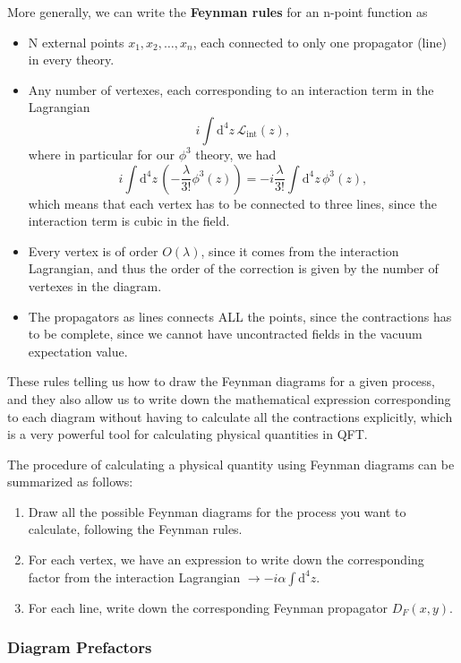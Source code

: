 More generally, we can write the \textbf{Feynman rules} for an n-point function as
\begin{itemize}
    \item N external points \(x_1, x_2, \ldots, x_n\), each connected to only one propagator (line) in every theory.
    \item Any number of vertexes, each corresponding to an interaction term in the Lagrangian
          \[
              i \int \mathrm{d}^4 z \, \mathcal{L}_{\text{int}} (z),
          \]
          where in particular for our \(\phi^3\) theory, we had
          \[
              i \int \mathrm{d}^4 z \, (-\frac{\lambda}{3!} \phi^3 (z)) = -i \frac{\lambda}{3!} \int \mathrm{d}^4 z \, \phi^3 (z),
          \]
          which means that each vertex has to be connected to three lines, since the interaction term is cubic in the field.
    \item Every vertex is of order \(O(\lambda)\), since it comes from the interaction Lagrangian, and thus the order of the correction is given by the number of vertexes in the diagram.
    \item The propagators as lines connects ALL the points, since the contractions has to be complete, since we cannot have uncontracted fields in the vacuum expectation value.
\end{itemize}
These rules telling us how to draw the Feynman diagrams for a given process, and they also allow us to write down the mathematical expression corresponding to each diagram without having to calculate all the contractions explicitly, which is a very powerful tool for calculating physical quantities in QFT.

The procedure of calculating a physical quantity using Feynman diagrams can be summarized as follows:
\begin{enumerate}
    \item Draw all the possible Feynman diagrams for the process you want to calculate, following the Feynman rules.
    \item For each vertex, we have an expression to write down the corresponding factor from the interaction Lagrangian \(\to  -i \alpha \int \mathrm{d}^4 z\).
    \item For each line, write down the corresponding Feynman propagator \(D_F (x,y)\).
\end{enumerate}

\subsubsection{Diagram Prefactors}

